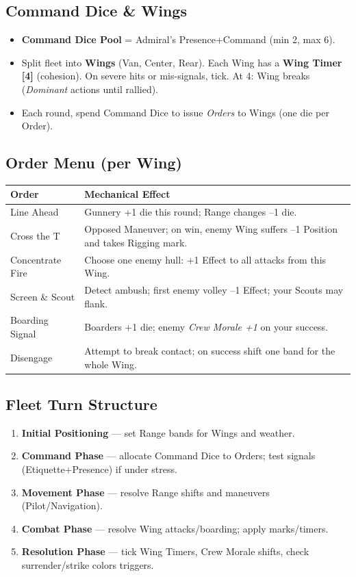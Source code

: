\documentclass[11pt,oneside]{book}
\begin{document}
\begin{itemize}
\subsection*{Command Dice \& Wings}
\begin{itemize}[leftmargin=*,itemsep=2pt]
  \item \textbf{Command Dice Pool} = Admiral's Presence+Command (min 2, max 6).
  \item Split fleet into \textbf{Wings} (Van, Center, Rear). Each Wing has a \textbf{Wing Timer [4]} (cohesion). On severe hits or mis-signals, tick. At 4: Wing breaks (\emph{Dominant} actions until rallied).
  \item Each round, spend Command Dice to issue \emph{Orders} to Wings (one die per Order).
\end{itemize}

\subsection*{Order Menu (per Wing)}
\begin{tabularx}{\linewidth}{@{}p{3.1cm} X@{}}
\toprule
\textbf{Order} & \textbf{Mechanical Effect}\\
\midrule
Line Ahead & Gunnery +1 die this round; Range changes --1 die.\\
Cross the T & Opposed Maneuver; on win, enemy Wing suffers --1 Position and takes Rigging mark.\\
Concentrate Fire & Choose one enemy hull: +1 Effect to all attacks from this Wing.\\
Screen \& Scout & Detect ambush; first enemy volley --1 Effect; your Scouts may flank.\\
Boarding Signal & Boarders +1 die; enemy \textit{Crew Morale +1} on your success.\\
Disengage & Attempt to break contact; on success shift one band for the whole Wing.\\
\bottomrule
\end{tabularx}

\subsection*{Fleet Turn Structure}
\begin{enumerate}[leftmargin=*,itemsep=2pt]
  \item \textbf{Initial Positioning} --- set Range bands for Wings and weather.
  \item \textbf{Command Phase} --- allocate Command Dice to Orders; test signals (Etiquette+Presence) if under stress.
  \item \textbf{Movement Phase} --- resolve Range shifts and maneuvers (Pilot/Navigation).
  \item \textbf{Combat Phase} --- resolve Wing attacks/boarding; apply marks/timers.
  \item \textbf{Resolution Phase} --- tick Wing Timers, Crew Morale shifts, check surrender/strike colors triggers.
\end{enumerate}


\end{itemize}
\end{document}

